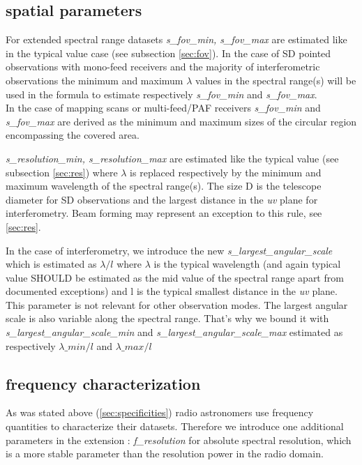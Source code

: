 \documentclass[11pt,a4paper]{ivoa}
\begin{document}
\subsection{spatial parameters}

For extended spectral range datasets \emph{s\_fov\_min, s\_fov\_max} are estimated like in the typical value case (see subsection \ref{sec:fov}).  
In the case of SD pointed observations with mono-feed receivers and the majority of interferometric observations the minimum and maximum
$\lambda$ values in the spectral range(s) will be used in the formula to estimate respectively \emph{s\_fov\_min} and  \emph{s\_fov\_max}. \\
In the case of mapping scans or multi-feed/PAF receivers \emph{ s\_fov\_min} and \emph{s\_fov\_max} are derived as the minimum and maximum sizes of the 
circular region encompassing the covered area.


\emph{s\_resolution\_min, s\_resolution\_max} are estimated like the typical value (see subsection \ref{sec:res}) where $\lambda$ is replaced respectively by the minimum and maximum wavelength of the spectral range(s). The size D is the telescope diameter for SD observations and the largest distance in the \emph{uv} plane for interferometry. Beam forming may represent an exception to this rule, see \ref{sec:res}.

In the case of interferometry, we introduce the new \emph{s\_largest\_angular\_scale} which is estimated as $\lambda/l$ where $\lambda$ is the typical
wavelength (and again typical value SHOULD be estimated as the mid value of the spectral range apart from documented exceptions) and l is the typical smallest distance in the \emph{uv} plane. This parameter is not relevant for other observation modes.
The largest angular scale is also variable along the spectral range. That's why we bound it with \emph{s\_largest\_angular\_scale\_min} and \emph{s\_largest\_angular\_scale\_max} estimated as  respectively $\lambda\_min/l$ and  $\lambda\_max/l$



\subsection{frequency characterization}

As was stated above (\ref{sec:specificities}) radio astronomers use frequency quantities to characterize their datasets. Therefore we introduce one additional parameters in the extension : 
\emph{f\_resolution} for absolute spectral resolution, which is a more stable parameter than the resolution power in the radio domain.
\end{document}
